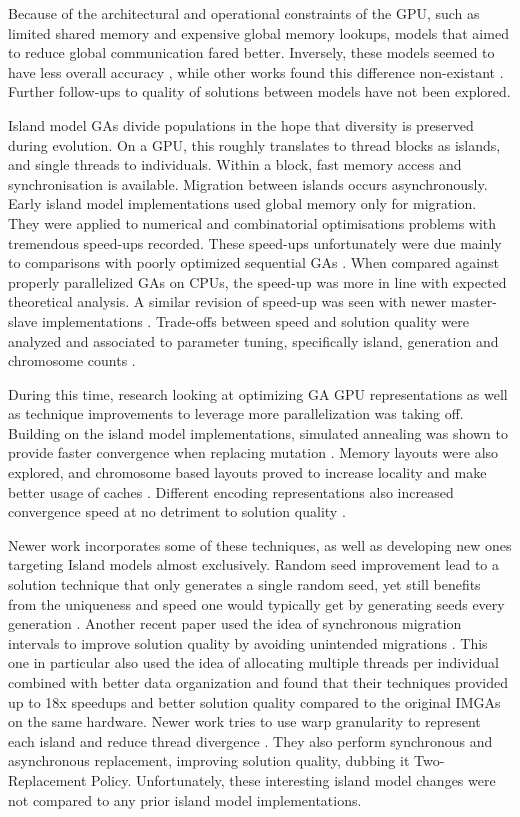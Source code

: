 \documentclass[11pt]{article}       %
\begin{document}
Because of the architectural and operational constraints of the GPU, such as limited shared memory and expensive global memory lookups, models that aimed to reduce global communication fared better. Inversely, these models seemed to have less overall accuracy \cite{Zheng2011-zr}, while other works found this difference non-existant \cite{jahne2016overview}. Further follow-ups to quality of solutions between models have not been explored.

Island model GAs divide populations in the hope that diversity is preserved during evolution. On a GPU, this roughly translates to thread blocks as islands, and single threads to individuals. Within a block, fast memory access and synchronisation is available. Migration between islands occurs asynchronously.
Early island model implementations \cite{Pospichal2010-lf, Van_Luong2010-mw} used global memory only for migration. They were applied to numerical and combinatorial optimisations problems with tremendous speed-ups recorded. These speed-ups unfortunately were due mainly to comparisons with poorly optimized sequential GAs \cite{Jaros2012-ni}. When compared against properly parallelized GAs on CPUs, the speed-up was more in line with expected theoretical analysis. A similar revision of speed-up was seen with newer master-slave implementations \cite{Sinha2015-dk}. Trade-offs between speed and solution quality were analyzed and associated to parameter tuning, specifically island, generation and chromosome counts \cite{Sun2019-fj}.

During this time, research looking at optimizing GA GPU representations as well as technique improvements to leverage more parallelization was taking off. Building on the island model implementations, simulated annealing was shown to provide faster convergence when replacing mutation \cite{li2017parallel}. Memory layouts were also explored, and chromosome based layouts proved to increase locality and make better usage of caches \cite{jahne2016overview}. Different encoding representations also increased convergence speed at no detriment to solution quality \cite{Pedemonte2011-zu}. 

Newer work incorporates some of these techniques, as well as developing new ones targeting Island models almost exclusively. Random seed improvement lead to a solution technique that only generates a single random seed, yet still benefits from the uniqueness and speed one would typically get by generating seeds every generation \cite{Sun2019-fj}. Another recent paper used the idea of synchronous migration intervals to improve solution quality by avoiding unintended migrations \cite{Janssen2022-kr}. This one in particular also used the idea of allocating multiple threads per individual \cite{shah2010gpu} combined with better data organization and found that their techniques provided up to 18x speedups and better solution quality compared to the original IMGAs on the same hardware.
Newer work tries to use warp granularity to represent each island and reduce thread divergence \cite{Amin2022-xd}. They also perform synchronous and asynchronous replacement, improving solution quality, dubbing it Two-Replacement Policy. Unfortunately, these interesting island model changes were not compared to any prior island model implementations.
\end{document}

